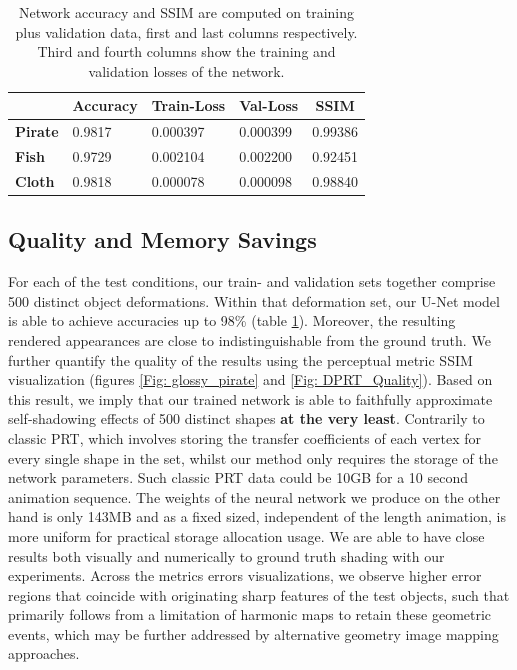 \begin{table}[h]
\begin{tabular}{|l|l|l|l|l|}
\hline
\textbf{}            & \textbf{Accuracy} & \textbf{Train-Loss} & \textbf{Val-Loss} & \multicolumn{1}{c|}{\textbf{SSIM}} \\ \hline
\textbf{Pirate} & 0.9817            & 0.000397            & 0.000399                 & 0.99386                      \\ \hline
\textbf{Fish}        & 0.9729            & 0.002104            & 0.002200                      &  0.92451                   \\ \hline
\textbf{Cloth}       & 0.9818            & 0.000078            & 0.000098                 & 0.98840                      \\ \hline
\end{tabular}
\caption{Network accuracy and SSIM are computed on training plus validation data, first and last columns respectively. Third and fourth columns show the training and validation losses of the network.} 
\label{Table: NN_Accuracy}
\end{table}

\subsection*{Quality and Memory Savings} \label{Sec: memory_savings}
For each of the test conditions, our train- and validation sets together comprise 500 distinct object deformations. 
Within that deformation set, our U-Net model is able to achieve accuracies up to 98\% (table \ref{Table: NN_Accuracy}). Moreover, the resulting rendered appearances are close to indistinguishable from the ground truth. We further quantify the quality of the results using the perceptual metric SSIM visualization (figures \ref{Fig: glossy_pirate} and \ref{Fig: DPRT_Quality}).  Based on this result, we imply that our trained network is able to faithfully approximate self-shadowing effects of 500 distinct shapes \textbf{at the very least}. Contrarily to classic PRT, which involves storing the transfer coefficients of each vertex for every single shape in the set, whilst our method only requires the storage of the network parameters. Such classic PRT data could be 10GB for a 10 second animation sequence. The weights of the neural network we produce on the other hand is only 143MB and as a fixed sized, independent of the length animation, is more uniform for practical storage allocation usage. We are able to have close results both visually and numerically to ground truth shading with our experiments. Across the metrics errors visualizations, we observe higher error regions that coincide with originating sharp features of the test objects, such that primarily follows from a limitation of harmonic maps to retain these geometric events, which may be further addressed by alternative geometry image mapping approaches.

